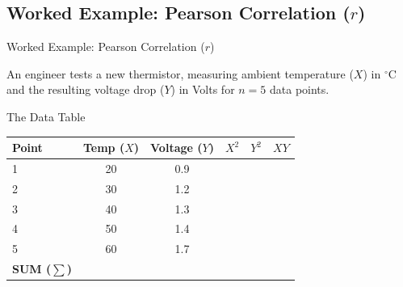 \subsection{Worked Example: Pearson Correlation ($r$)}
\begin{frame}{Worked Example: Pearson Correlation ($r$)}
    
    \def\boxwidth{\textwidth} 
    \mode<beamer>{\def\boxwidth{0.88\textwidth}} 
    
    \begin{example}
        \begin{minipage}{\boxwidth}
            An engineer tests a new thermistor, measuring ambient temperature ($X$) in $^{\circ}$C and the resulting voltage drop ($Y$) in Volts for $n = 5$ data points.
        \end{minipage}%
    \end{example}
    
    \begin{block}{The Data Table}
        \centering
        \begin{tabular}{l c c c c c}
            \hline
            \textbf{Point} & \textbf{Temp ($X$)} & \textbf{Voltage ($Y$)} & \textbf{$X^2$} & \textbf{$Y^2$} & \textbf{$XY$} \\
            \hline
            1 & 20 & 0.9 & &  &  \\
            2 & 30 & 1.2 &  &  &  \\
            3 & 40 & 1.3 &  &  &  \\
            4 & 50 & 1.4 &  &  &  \\
            5 & 60 & 1.7 &  &  &  \\
            \hline
            \textbf{SUM ($\sum$)} &  && &&  \\
            \hline
        \end{tabular}
    \end{block}
    
\end{frame}

